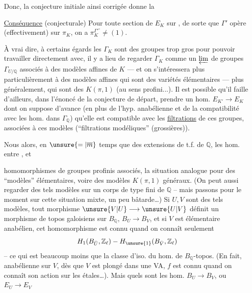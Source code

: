 Donc, la conjecture initiale ainsi corrigée donne la

\uline{Conséquence} (conjecturale) Pour toute  section de $E_K$ sur  , de sorte que $\Gamma'$ opère (effectivement) sur $\pi_K$, on a  $\pi_K^{\Gamma'^\circ}\ne(1)$.

À vrai dire, à certains égards les $\Gamma_K$ sont des groupes trop gros pour pouvoir travailler directement avec, il y a lieu de regarder $\Gamma_K$ comme un $\varprojlim$ de groupes $\Gamma_{U/\mathbb Q}$ associés à des modèles affines de $K$ --- et on s'intéressera plus particulièrement à des modèles affines qui sont des variétés élémentaires --- plus généralement, qui sont des $K(\pi,1)$ (au sens profini...). Il est possible qu'il faille d'ailleurs, dans l'énoncé de la conjecture de départ, prendre un hom.  $E_{K'}\longrightarrow E_K$ dont on suppose d'avance (en plus de l'hyp. anabélienne et de la compatibilité avec les hom. dans $\Gamma_{\mathbb Q}$) qu'elle est compatible avec les \uline{filtrations} de ces groupes, associées à ces modèles (``filtrations modéliques'' (grossières)).

Nous  alors, en $\unsure{=|\overline m}$ temps que des extensions de t.f. de $\mathbb Q$, les hom. entre , et

homomorphismes de groupes profinis associés,   la situation analogue pour des ``modèles'' élémentaires, voire des modèles $K(\pi,1)$ généraux. (On peut aussi regarder des tels modèles sur un corps   de type fini de $\mathbb{Q}$ -- mais passons pour le moment sur cette situation mixte, un peu bâtarde\ldots) Si $U,V$ sont des tels modèles, tout morphisme $\unsure{V|U}\longrightarrow\unsure{U|V}$ définit un morphisme de topos galoisiens sur $B_{\mathbb{Q}}$, $B_U\longrightarrow B_V$,  et si $V$ est  élémentaire anabélien, cet homomorphisme est connu quand on connaît seulement
\[
H_1(B_{\bar U},\mathbb{Z}_{\ell})-H_{\unsure{1}}(B_{\bar V},\mathbb{Z}_{\ell})
\]
-- ce qui est beaucoup moins que la classe d'iso. du hom. de $B_{\mathbb{Q}}$-topos. (En fait,   anabélienne sur $V$, dès que $V$ est plongé dans une VA, $f$ est connu quand on connaît son action sur les  étales\ldots). Mais quels sont les hom. $B_U\longrightarrow B_V$, ou $E_U\longrightarrow E_V$

